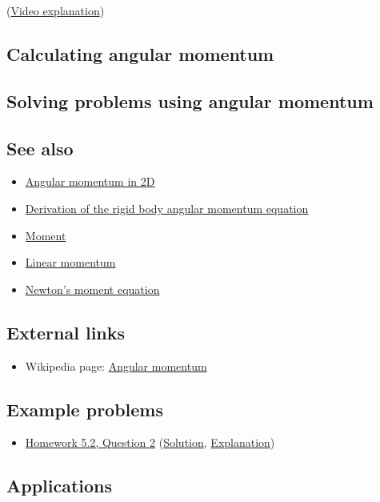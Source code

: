 \documentclass{article}
\begin{document}
(\href{angular_momentum_2d_vs_3d_video}{Video explanation})

\subsection{Calculating angular momentum}

\subsection{Solving problems using angular momentum}

\subsection{See also}

\begin{itemize}
\item \href{angular_momentum_2d}{Angular momentum in 2D}
\item \href{angular_momentum_rigid_body_derivation}{Derivation of the
    rigid body angular momentum equation}
\item \href{moment}{Moment}
\item \href{linear_momentum}{Linear momentum}
\item \href{newtons_eqn_moment}{Newton's moment equation}
\end{itemize}

\subsection{External links}

\begin{itemize}
\item Wikipedia page:
  \href{http://en.wikipedia.org/wiki/Angular_momentum}{Angular
    momentum}
\end{itemize}

\subsection{Example problems}

\begin{itemize}
\item \href{hw5-2_q2}{Homework 5.2, Question 2}
  (\href{hw5-2_q2_soln}{Solution},
  \href{hw5-2_q2_explain}{Explanation})
\end{itemize}

\subsection{Applications}
\end{document}
